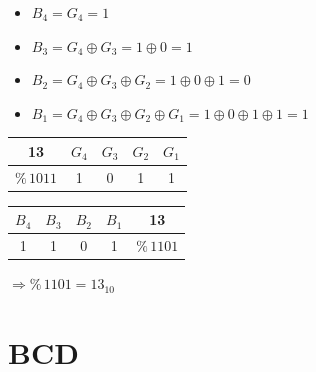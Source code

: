 \documentclass[11pt,a4paper]{article}
\begin{document}
\begin{table}[!ht]
  \centering
  \begin{minipage}{0.60\textwidth}

\begin{itemize}
\item $ B_{4} = G_{4} = 1 $
\item $ B_{3} = G_{4} \oplus G_{3} = 1 \oplus 0 = 1 $
\item $ B_{2} = G_{4} \oplus G_{3} \oplus G_{2} = 1 \oplus 0 \oplus 1 = 0 $
\item $ B_{1} = G_{4} \oplus G_{3} \oplus G_{2} \oplus G_{1} = 1 \oplus 0 \oplus 1 \oplus 1 = 1 $
\end{itemize}

  \end{minipage}
  \hfillx
  \begin{minipage}{0.40\textwidth}
    \centering

\begin{tabular}{ c  | c | c | c | c | }
13                    & $G_{4}$ & $G_{3}$ & $G_{2}$ & $G_{1}$ \\
\hline
$ \text{\%} \, 1011 $ & 1 & 0 & 1 & 1 \\
\end{tabular}

\bigskip

\begin{tabular}{ | c | c | c | c |   c }
$B_{4}$ & $B_{3}$ & $B_{2}$ & $B_{1}$  & 13\\
\hline
1 & 1 & 0 & 1                          & $ \text{\%} \, 1101 $\\
\end{tabular}

\bigskip

$ \Rightarrow \text{\%} \, 1101 = 13_{10}$

  \end{minipage}
\end{table}


\clearpage


\section{BCD}
\end{document}
